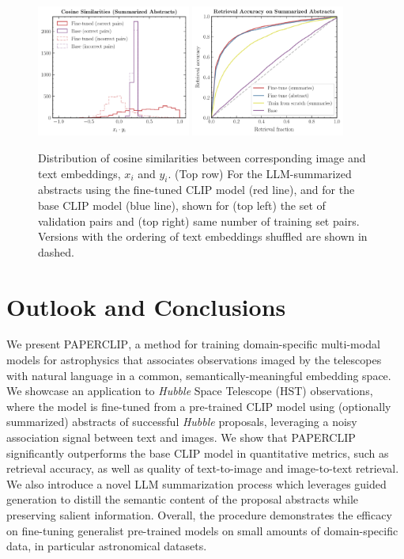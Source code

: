 \documentclass[10pt]{article} %
\newcommand{\hubble}{\emph{Hubble}\xspace}
\begin{document}
\begin{figure}[!h]
\includegraphics[width=0.45\textwidth]{plots/sim_val.pdf}
\includegraphics[width=0.45\textwidth]{plots/retrieval.pdf}
\caption{Distribution of cosine similarities between corresponding image and text embeddings, $x_i$ and $y_i$. (Top row) For the LLM-summarized abstracts using the fine-tuned CLIP model (red line), and for the base CLIP model (blue line), shown for (top left) the set of validation pairs and (top right) same number of training set pairs. Versions with the ordering of text embeddings shuffled are shown in dashed.}
\label{fig:sim_valtrain}
\end{figure}

\section{Outlook and Conclusions}
\label{sec:conclusion}

We present \textsc{PAPERCLIP}, a method for training domain-specific multi-modal models for astrophysics that associates observations imaged by the telescopes with natural language in a common, semantically-meaningful embedding space.
%
We showcase an application to \hubble Space Telescope (HST) observations, where the model is fine-tuned from a pre-trained CLIP model using (optionally summarized) abstracts of successful \hubble proposals, leveraging a noisy association signal between text and images.
%
We show that \textsc{PAPERCLIP} significantly outperforms the base CLIP model in quantitative metrics, such as retrieval accuracy, as well as quality of text-to-image and image-to-text retrieval.
%
We also introduce a novel LLM summarization process which leverages guided generation to distill the semantic content of the proposal abstracts while preserving salient information. 
%
Overall, the procedure demonstrates the efficacy on fine-tuning generalist pre-trained models on small amounts of domain-specific data, in particular astronomical datasets.
\end{document}
